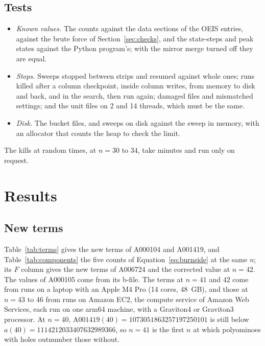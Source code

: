 \documentclass[11pt]{a000104}
\numberwithin{equation}{section}
\begin{document}
\subsection{Tests}

\begin{itemize}
  \item \emph{Known values.} The counts against the data sections of the OEIS entries, against the brute force of Section~\ref{sec:checks}, and the state-steps and peak states against the Python program's; with the mirror merge turned off they are equal.
  \item \emph{Stops.} Sweeps stopped between strips and resumed against whole ones; runs killed after a column checkpoint, inside column writes, from memory to disk and back, and in the search, then run again; damaged files and mismatched settings; and the unit files on 2 and 14 threads, which must be the same.
  \item \emph{Disk.} The bucket files, and sweeps on disk against the sweep in memory, with an allocator that counts the heap to check the limit.
\end{itemize}

The kills at random times, at $n = 30$ to $34$, take minutes and run only on request.

\section{Results}\label{sec:results}

\subsection{New terms}

Table~\ref{tab:terms} gives the new terms of A000104 and A001419, and Table~\ref{tab:components} the five counts of Equation~\eqref{eq:burnside} at the same $n$; its $F$ column gives the new terms of A006724 and the corrected value at $n = 42$.
The values of A000105 come from its b-file.
The terms at $n = 41$ and $42$ come from runs on a laptop with an Apple M4 Pro (14 cores, 48~GB), and those at $n = 43$ to $46$ from runs on Amazon EC2, the compute service of Amazon Web Services, each run on one arm64 machine, with a Graviton4 or Graviton3 processor.
At $n = 40$, $\text{A001419}(40) = 1073051863257197250101$ is still below $a(40) = 1114212033407632989366$, so $n = 41$ is the first $n$ at which polyominoes with holes outnumber those without.
\end{document}

